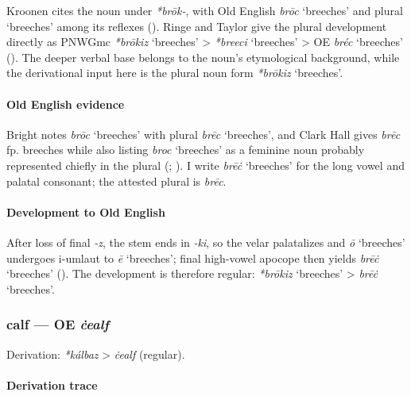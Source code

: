 \documentclass[
  british,
  a4paper,
]{article}
\providecommand{\Recon}[1]{\emph{*#1}}
\begin{document}
Kroonen cites the noun under \emph{*brōk-}, with Old English \emph{brōc}
`breeches' and plural `breeches' among its reflexes
(). Ringe and Taylor give the
plural development directly as PNWGmc \Recon{brōkiz} `breeches'
\textgreater{} \Recon{breeci} `breeches' \textgreater{} OE \emph{bréc}
`breeches' (). The
deeper verbal base belongs to the noun's etymological background, while
the derivational input here is the plural noun form \Recon{brōkiz}
`breeches'.

\paragraph{Old English evidence}\label{old-english-evidence-11}

Bright notes \emph{brōc} `breeches' with plural \emph{brēc} `breeches',
and Clark Hall gives \emph{brēc} fp. breeches while also listing
\emph{broc} `breeches' as a feminine noun probably represented chiefly
in the plural (;
). I write \emph{brēċ}
`breeches' for the long vowel and palatal consonant; the attested plural
is \emph{brēc}.

\paragraph{Development to Old
English}\label{development-to-old-english-11}

After loss of final \emph{-z}, the stem ends in \emph{-ki}, so the velar
palatalizes and \emph{ō} `breeches' undergoes i-umlaut to \emph{ē}
`breeches'; final high-vowel apocope then yields \emph{brēċ} `breeches'
(). The development
is therefore regular: \Recon{brōkiz} `breeches' \textgreater{}
\emph{brēċ} `breeches'.

\subsubsection{\texorpdfstring{calf --- OE
\emph{ċealf}}{calf --- OE ċealf}}\label{calf-oe-ux10bealf}

Derivation: \emph{*kálbaz} \textgreater{} \emph{ċealf} (regular).

\paragraph{Derivation trace}\label{derivation-trace-13}
\end{document}
